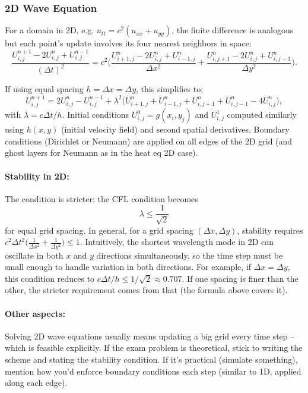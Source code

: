 \documentclass[a4paper,11pt]{report}
\begin{document}
\subsubsection{2D Wave Equation}
For a domain in 2D, e.g. $u_{tt} = c^2(u_{xx}+u_{yy})$, the finite difference is analogous but each point's update involves its four nearest neighbors in space:
$$\frac{U_{i,j}^{n+1} - 2U_{i,j}^n + U_{i,j}^{n-1}}{(\Delta t)^2} = c^2 \Big(\frac{U_{i+1,j}^n - 2U_{i,j}^n + U_{i-1,j}^n}{\Delta x^2} + \frac{U_{i,j+1}^n - 2U_{i,j}^n + U_{i,j-1}^n}{\Delta y^2}\Big).$$

If using equal spacing $h = \Delta x = \Delta y$, this simplifies to:
$$U_{i,j}^{n+1} = 2U_{i,j}^n - U_{i,j}^{n-1} + \lambda^2 \Big(U_{i+1,j}^n + U_{i-1,j}^n + U_{i,j+1}^n + U_{i,j-1}^n - 4U_{i,j}^n\Big),$$
with $\lambda = c\Delta t/h$. Initial conditions $U_{i,j}^0 = g(x_i,y_j)$ and $U_{i,j}^1$ computed similarly using $h(x,y)$ (initial velocity field) and second spatial derivatives. Boundary conditions (Dirichlet or Neumann) are applied on all edges of the 2D grid (and ghost layers for Neumann as in the heat eq 2D case).

\paragraph{Stability in 2D:} The condition is stricter: the CFL condition becomes
$$\lambda \le \frac{1}{\sqrt{2}}$$
for equal grid spacing. In general, for a grid spacing $(\Delta x,\Delta y)$, stability requires $c^2\Delta t^2\Big(\frac{1}{\Delta x^2}+\frac{1}{\Delta y^2}\Big) \le 1$. Intuitively, the shortest wavelength mode in 2D can oscillate in both $x$ and $y$ directions simultaneously, so the time step must be small enough to handle variation in both directions. For example, if $\Delta x = \Delta y$, this condition reduces to $c\Delta t/h \le 1/\sqrt{2} \approx 0.707$. If one spacing is finer than the other, the stricter requirement comes from that (the formula above covers it).

\paragraph{Other aspects:} Solving 2D wave equations usually means updating a big grid every time step -- which is feasible explicitly. If the exam problem is theoretical, stick to writing the scheme and stating the stability condition. If it's practical (simulate something), mention how you'd enforce boundary conditions each step (similar to 1D, applied along each edge).
\end{document}
